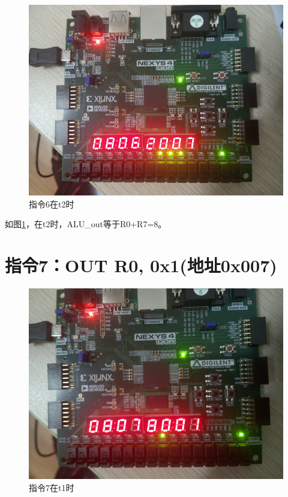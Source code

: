 \documentclass[forprint]{WHUBachelor}
\begin{document}
\begin{figure}[H]
  \centering
  \includegraphics[width=5in]{figures/download/51.jpg}
  \caption{指令6在t2时}
  \label{fig:down:51}
\end{figure}

如图\ref{fig:down:51}，在t2时，ALU\_out等于R0+R7=8。

\section{指令7：OUT R0, 0x1(地址0x007)}

\begin{figure}[H]
  \centering
  \includegraphics[width=5in]{figures/download/60.jpg}
  \caption{指令7在t1时}
  \label{fig:down:60}
\end{figure}
\end{document}

